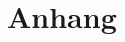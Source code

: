 \documentclass[12pt, a4paper, ngerman, bidi=default]{article}
\begin{document}
\endgroup


\newpage
\appendix
\section{Anhang}
\begingroup
\small
\end{document}
